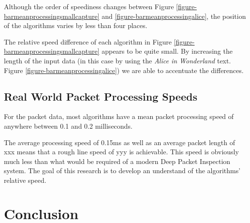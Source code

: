 \documentclass[11pt]{article}
\begin{document}
Although the order of speediness changes between Figure \ref{figure-barmeanprocessingsmallcapture} and \ref{figure-barmeanprocessingalice}, the position of the algorithms varies by less than four places.

The relative speed difference of each algorithm in Figure \ref{figure-barmeanprocessingsmallcapture} appears to be quite small. By increasing the length of the input data (in this case by using the \textit{Alice in Wonderland} text. Figure \ref{figure-barmeanprocessingalice}) we are able to accentuate the differences.

\subsection{Real World Packet Processing Speeds}

For the packet data, most algorithms have a mean packet processing speed of anywhere between 0.1 and 0.2 milliseconds.

The average processing speed of 0.15ms as well as an average packet length of xxx means that a rough line speed of yyy is achievable. This speed is obviously much less than what would be required of a modern Deep Packet Inspection system. The goal of this research is to develop an understand of the algorithms' relative speed.

\section{Conclusion}



\end{document}
